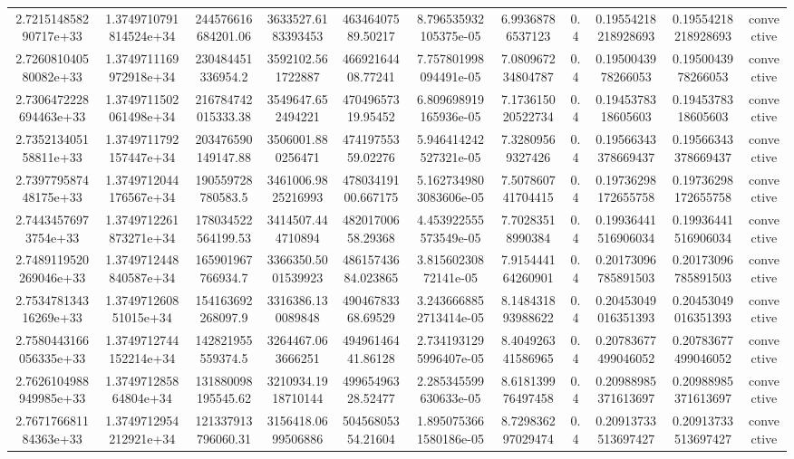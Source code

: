 \begin{table}
\begin{tabular}{ccccccccccc}
2.721514858290717e+33 & 1.3749710791814524e+34 & 244576616684201.06 & 3633527.6183393453 & 46346407589.50217 & 8.796535932105375e-05 & 6.99368786537123 & 0.4 & 0.19554218218928693 & 0.19554218218928693 & convective \\
2.726081040580082e+33 & 1.3749711169972918e+34 & 230484451336954.2 & 3592102.561722887 & 46692164408.77241 & 7.757801998094491e-05 & 7.080967234804787 & 0.4 & 0.1950043978266053 & 0.1950043978266053 & convective \\
2.7306472228694463e+33 & 1.3749711502061498e+34 & 216784742015333.38 & 3549647.652494221 & 47049657319.95452 & 6.809698919165936e-05 & 7.173615020522734 & 0.4 & 0.1945378318605603 & 0.1945378318605603 & convective \\
2.735213405158811e+33 & 1.3749711792157447e+34 & 203476590149147.88 & 3506001.880256471 & 47419755359.02276 & 5.946414242527321e-05 & 7.32809569327426 & 0.4 & 0.19566343378669437 & 0.19566343378669437 & convective \\
2.739779587448175e+33 & 1.3749712044176567e+34 & 190559728780583.5 & 3461006.9825216993 & 47803419100.667175 & 5.1627349803083606e-05 & 7.507860741704415 & 0.4 & 0.19736298172655758 & 0.19736298172655758 & convective \\
2.74434576973754e+33 & 1.3749712261873271e+34 & 178034522564199.53 & 3414507.444710894 & 48201700658.29368 & 4.453922555573549e-05 & 7.70283518990384 & 0.4 & 0.19936441516906034 & 0.19936441516906034 & convective \\
2.7489119520269046e+33 & 1.3749712448840587e+34 & 165901967766934.7 & 3366350.5001539923 & 48615743684.023865 & 3.81560230872141e-05 & 7.915444164260901 & 0.4 & 0.20173096785891503 & 0.20173096785891503 & convective \\
2.753478134316269e+33 & 1.374971260851015e+34 & 154163692268097.9 & 3316386.130089848 & 49046783368.69529 & 3.2436668852713414e-05 & 8.148431893988622 & 0.4 & 0.20453049016351393 & 0.20453049016351393 & convective \\
2.7580443166056335e+33 & 1.3749712744152214e+34 & 142821955559374.5 & 3264467.063666251 & 49496146441.86128 & 2.7341931295996407e-05 & 8.404926341586965 & 0.4 & 0.20783677499046052 & 0.20783677499046052 & convective \\
2.7626104988949985e+33 & 1.374971285864804e+34 & 131880098195545.62 & 3210934.1918710144 & 49965496328.52477 & 2.285345599630633e-05 & 8.618139976497458 & 0.4 & 0.20988985371613697 & 0.20988985371613697 & convective \\
2.767176681184363e+33 & 1.3749712954212921e+34 & 121337913796060.31 & 3156418.0699506886 & 50456805354.21604 & 1.8950753661580186e-05 & 8.729836297029474 & 0.4 & 0.20913733513697427 & 0.20913733513697427 & convective \\

\end{tabular}
\end{table}
